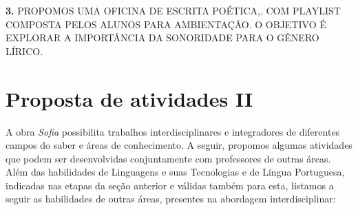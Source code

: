 \documentclass{extarticle}
\begin{document}
\textbf{3.} PROPOMOS UMA OFICINA DE ESCRITA POÉTICA,. COM PLAYLIST
COMPOSTA PELOS ALUNOS PARA AMBIENTAÇÃO. O OBJETIVO É EXPLORAR A
IMPORTÂNCIA DA SONORIDADE PARA O GÊNERO LÍRICO.

\section{Proposta de atividades II}

A obra \emph{Sofia} possibilita trabalhos interdisciplinares e
integradores de diferentes campos do saber e áreas de conhecimento. A
seguir, propomos algumas atividades que podem ser desenvolvidas
conjuntamente com professores de outras áreas. Além das habilidades de
Linguagens e suas Tecnologias e de Língua Portuguesa, indicadas nas
etapas da seção anterior e válidas também para esta, listamos a seguir
as habilidades de outras áreas, presentes na abordagem interdisciplinar:






\end{document}
